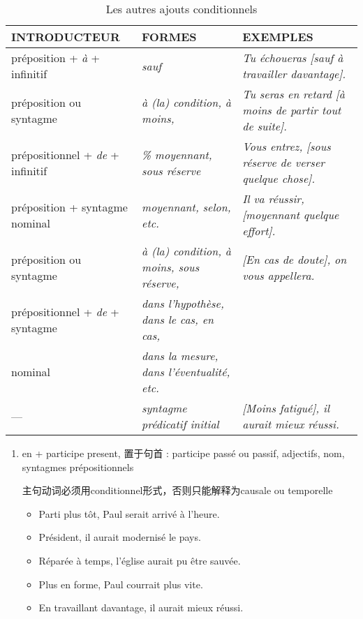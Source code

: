 \documentclass[UTF8]{report}
\begin{document}
\begin{table}[H]
    \centering 
    \small
    \begin{adjustbox}{max width =\textwidth}
        \begin{tabular}{|l|l|l|}
        \hline
        \rowcolor{cyan!20}
        \textbf{INTRODUCTEUR} & \textbf{FORMES} & \textbf{EXEMPLES} \\
        \hline
        préposition + \textit{à} + infinitif & \textit{sauf} & \textit{Tu échoueras [sauf à travailler davantage].} \\
        \hline
        préposition ou syntagme & \textit{à (la) condition, à moins,} & \textit{Tu seras en retard [à moins de partir tout de suite].} \\
        prépositionnel + \textit{de} + infinitif & \textit{\% moyennant, sous réserve} & \textit{Vous entrez, [sous réserve de verser quelque chose].} \\
        \hline
        préposition + syntagme nominal & \textit{moyennant, selon, etc.} & \textit{Il va réussir, [moyennant quelque effort].} \\
        \hline
        préposition ou syntagme & \textit{à (la) condition, à moins, sous réserve,} & \textit{[En cas de doute], on vous appellera.} \\
        prépositionnel + \textit{de} + syntagme & \textit{dans l'hypothèse, dans le cas, en cas,} & \\
        nominal & \textit{dans la mesure, dans l'éventualité, etc.} & \\
        \hline
        --- & \textit{syntagme prédicatif initial} & \textit{[Moins fatigué], il aurait mieux réussi.} \\
        \hline
        \end{tabular}
    \end{adjustbox}
    \caption{Les autres ajouts conditionnels}
\end{table}

\begin{enumerate}
    \item en + participe present, 置于句首 : participe passé ou passif, adjectifs, nom, syntagmes prépositionnels
    
    主句动词必须用conditionnel形式，否则只能解释为causale ou temporelle
    \begin{itemize}
        \item Parti plus tôt, Paul serait arrivé à l’heure.
        \item Président, il aurait modernisé le pays.
        \item Réparée à temps, l’église aurait pu être sauvée.
        \item Plus en forme, Paul courrait plus vite.
        \item En travaillant davantage, il aurait mieux réussi.
    \end{itemize}
\end{enumerate}
\end{document}
